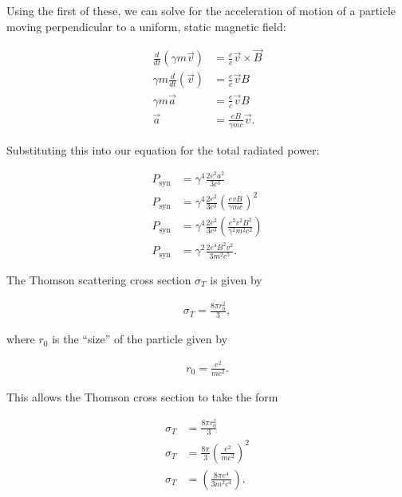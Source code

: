 \documentclass[12pt]{article}
\begin{document}
{\noindent}Using the first of these, we can solve for the acceleration of motion of a particle moving perpendicular to a uniform, static magnetic field:

\begin{equation*}
\begin{split}
    \frac{d}{dt}(\gamma m\vec{v}) &= \frac{e}{c} \vec{v} \times \vec{B} \\
    \gamma m \frac{d}{dt}(\vec{v}) &= \frac{e}{c} \vec{v} B \\
    \gamma m \vec{a} &= \frac{e}{c} \vec{v} B \\
    \vec{a} &= \frac{eB}{\gamma mc} \vec{v}.
\end{split}
\end{equation*}

{\noindent}Substituting this into our equation for the total radiated power:

\begin{equation*}
\begin{split}
    P_\mathrm{syn} &= \gamma^4 \frac{2e^2a^2}{3c^3} \\
    P_\mathrm{syn} &= \gamma^4 \frac{2e^2}{3c^3} \left(\frac{evB}{\gamma mc}\right)^2 \\
    P_\mathrm{syn} &= \gamma^4 \frac{2e^2}{3c^3} \left(\frac{e^2v^2B^2}{\gamma^2 m^2c^2}\right) \\
    P_\mathrm{syn} &= \gamma^2 \frac{2e^4B^2v^2}{3m^2c^5}.
\end{split}
\end{equation*}

The Thomson scattering cross section $\sigma_T$ is given by

\begin{align*}
    \sigma_T = \frac{8\pi r_0^2}{3},
\end{align*}

{\noindent}where $r_0$ is the ``size'' of the particle given by 

\begin{align*}
    r_0 = \frac{e^2}{mc^2}.
\end{align*}

{\noindent}This allows the Thomson cross section to take the form

\begin{equation*}
\begin{split}
    \sigma_T &= \frac{8\pi r_0^2}{3} \\
    \sigma_T &= \frac{8\pi}{3} \left(\frac{e^2}{mc^2}\right)^2 \\
    \sigma_T &= \left(\frac{8\pi e^4}{3m^2c^4}\right).
\end{split}
\end{equation*}
\end{document}
